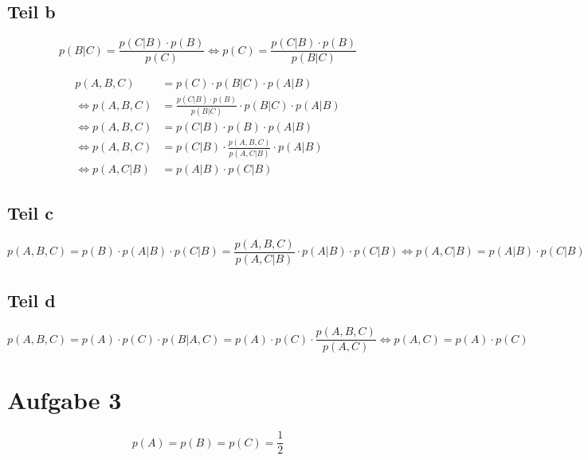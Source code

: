 \documentclass[10pt,a4paper]{article}
\begin{document}
\subsection{Teil b}

\begin{equation}
  p(B | C) = \frac{p(C | B) \cdot p(B)}{p(C)} \Leftrightarrow p(C) = \frac{p(C | B) \cdot p(B)}{p(B | C)}
\end{equation}

\begin{align*}
  p(A, B, C) & = p(C) \cdot p(B | C) \cdot p(A | B)\\
  \Leftrightarrow p(A, B, C) & = \frac{p(C | B) \cdot p(B)}{p(B | C)} \cdot p(B | C) \cdot p(A | B)\\
  \Leftrightarrow p(A, B, C) & = p(C | B) \cdot p(B) \cdot p(A | B)\\
  \Leftrightarrow p(A, B, C) & = p(C | B) \cdot \frac{p(A, B, C)}{p(A, C | B)} \cdot p(A | B)\\
  \Leftrightarrow p(A, C | B) & = p(A | B) \cdot p(C | B)
\end{align*}

\subsection{Teil c}

\begin{equation}
  p(A, B, C) = p(B) \cdot p(A | B) \cdot p(C | B) = \frac{p(A, B, C)}{p(A, C | B)} \cdot p(A | B) \cdot p(C | B) \Leftrightarrow p(A, C | B) = p(A | B) \cdot p(C | B)
\end{equation}

\subsection{Teil d}

\begin{equation}
  p(A, B, C) = p(A) \cdot p(C) \cdot p(B | A, C) = p(A) \cdot p(C) \cdot \frac{p(A, B, C)}{p(A, C)} \Leftrightarrow p(A, C) = p(A) \cdot p(C)
\end{equation}

\section{Aufgabe 3}

\begin{equation}
  p(A) = p(B) = p(C) = \frac{1}{2}
\end{equation}
\end{document}
